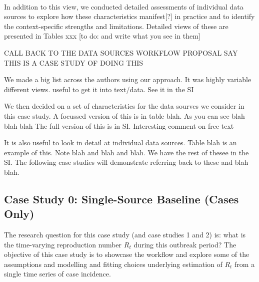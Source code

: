 \documentclass{article}
\begin{document}
\paragraph{}In addition to this view, we conducted detailed assessments of individual data sources to explore how these characteristics manifest[?] in practice and to identify the context-specific strengths and limitations. Detailed views of these are presented in Tables xxx [to do: and write what you see in them]

CALL BACK TO THE DATA SOURCES WORKFLOW PROPOSAL
SAY THIS IS A CASE STUDY OF DOING THIS

We made a big list across the authors using our approach. It was highly variable different views. useful to get it into text/data. See it in the SI

We then decided on a set of characteristics for the data sourves we consider in this case study. A focussed version of this is in table blah. As you can see blah blah blah
The full version of this is in SI. Interesting comment on free text

It is also useful to look in detail at individual data sources. Table blah is an example of this. Note blah and blah and blah.
We have the rest of thesee in the SI. 
The following case studies will demonstrate referring back to these and blah blah.



\subsection{Case Study 0: Single-Source Baseline (Cases Only)}


The research question for this case study (and case studies 1 and 2) is: what is the time-varying reproduction number $R_t$ during this outbreak period?
The objective of this case study is to showcase the workflow and explore some of the assumptions and modelling and fitting choices underlying estimation of $R_t$ from a single time series of case incidence.



\end{document}

